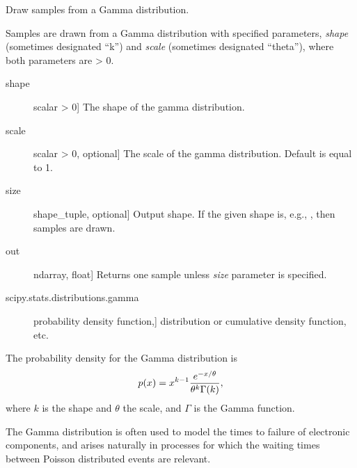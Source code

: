 \documentclass[letterpaper,10pt,english]{sphinxmanual}
\begin{document}
\begin{fulllineitems}
\label{pygeomod:pygeomod.geomodeller_xml_obj.gamma}
Draw samples from a Gamma distribution.

Samples are drawn from a Gamma distribution with specified parameters,
\emph{shape} (sometimes designated ``k'') and \emph{scale} (sometimes designated
``theta''), where both parameters are \textgreater{} 0.
\begin{description}
\item[{shape}] \leavevmode{[}scalar \textgreater{} 0{]}
The shape of the gamma distribution.

\item[{scale}] \leavevmode{[}scalar \textgreater{} 0, optional{]}
The scale of the gamma distribution.  Default is equal to 1.

\item[{size}] \leavevmode{[}shape\_tuple, optional{]}
Output shape.  If the given shape is, e.g., , then
 samples are drawn.

\end{description}
\begin{description}
\item[{out}] \leavevmode{[}ndarray, float{]}
Returns one sample unless \emph{size} parameter is specified.

\end{description}
\begin{description}
\item[{scipy.stats.distributions.gamma}] \leavevmode{[}probability density function,{]}
distribution or cumulative density function, etc.

\end{description}

The probability density for the Gamma distribution is
\begin{gather}
\begin{split}p(x) = x^{k-1}\frac{e^{-x/\theta}}{\theta^k\Gamma(k)},\end{split}\notag
\end{gather}
where \(k\) is the shape and \(\theta\) the scale,
and \(\Gamma\) is the Gamma function.

The Gamma distribution is often used to model the times to failure of
electronic components, and arises naturally in processes for which the
waiting times between Poisson distributed events are relevant.


\end{fulllineitems}
\end{document}

